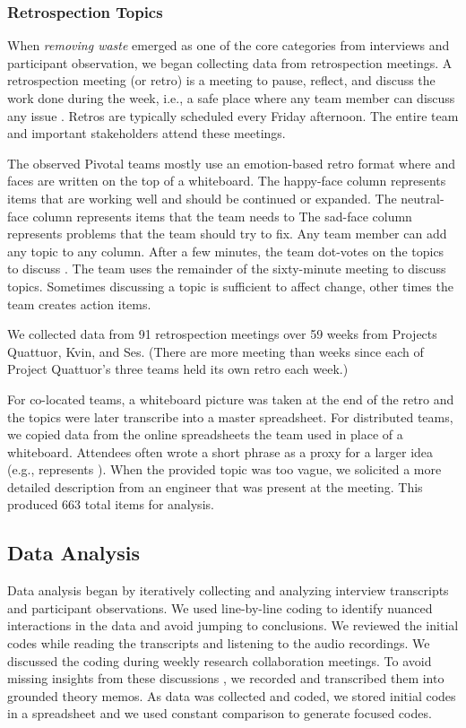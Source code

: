 \subsubsection{Retrospection Topics}
When \textit{removing waste} emerged as one of the core categories from interviews and participant observation, we began collecting data from retrospection meetings. A retrospection meeting (or retro) is a meeting to pause, reflect, and discuss the work done during the week, i.e., a safe place where any team member can discuss any issue \cite{DerbyAgileRetrospectives}. Retros are typically scheduled every Friday afternoon. The entire team and important stakeholders attend these meetings. 

The observed Pivotal teams mostly use an emotion-based retro format where   and  faces are written on the top of a whiteboard. The happy-face column represents items that are working well and should be continued or expanded. The neutral-face column represents items that the team needs to  The sad-face column represents problems that the team should try to fix. Any team member can add any topic to any column. After a few minutes, the team dot-votes on the topics to discuss \cite{DerbyAgileRetrospectives}. The team uses the remainder of the sixty-minute meeting to discuss topics. Sometimes discussing a topic is sufficient to affect change, other times the team creates action items. 

We collected data from 91 retrospection meetings over 59 weeks from Projects Quattuor, Kvin, and Ses. (There are more meeting than weeks since each of Project Quattuor's three teams held its own retro each week.)


For co-located teams, a whiteboard picture was taken at the end of the retro and the topics were later transcribe into a master spreadsheet. For distributed teams, we copied data from the online spreadsheets the team used in place of a whiteboard. Attendees often wrote a short phrase as a proxy for a larger idea (e.g.,   represents ). When the provided topic was too vague, we solicited a more detailed description from an engineer that was present at the meeting. This produced 663 total items for analysis. 


\subsection{Data Analysis}
Data analysis began by iteratively collecting and analyzing interview transcripts and participant observations. We used line-by-line coding \cite{Charmaz} to identify nuanced interactions in the data and avoid jumping to conclusions. We reviewed the initial codes while reading the transcripts and listening to the audio recordings.  We discussed the coding during weekly research collaboration meetings. To avoid missing insights from these discussions \cite{GlaserTheoreticalSensitivity}, we recorded and transcribed them into grounded theory memos. As data was collected and coded, we stored initial codes in a spreadsheet and we used constant comparison to generate focused codes.

